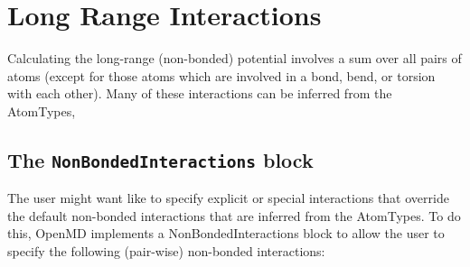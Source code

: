 \documentclass[letterpaper]{report}
\begin{document}
\section{\label{section::ffLongRange}Long Range Interactions}

Calculating the long-range (non-bonded) potential involves a sum over
all pairs of atoms (except for those atoms which are involved in a
bond, bend, or torsion with each other).  Many of these interactions
can be inferred from the AtomTypes,

\subsection{\label{section:ffNBinteraction}The {\tt NonBondedInteractions}
  block}

The user might want like to specify explicit or special interactions
that override the default non-bonded interactions that are inferred
from the AtomTypes.  To do this, OpenMD implements a
NonBondedInteractions block to allow the user to specify the following
(pair-wise) non-bonded interactions:
\end{document}
